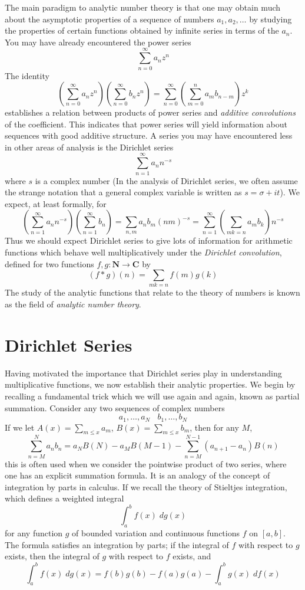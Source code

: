 The main paradigm to analytic number theory is that one may obtain much about the asymptotic properties of a sequence of numbers $a_1, a_2, \dots$ by studying the properties of certain functions obtained by infinite series in terms of the $a_n$. You may have already encountered the power series
%
\[ \sum_{n = 0}^\infty a_n z^n \]
%
The identity
%
\[ \left( \sum_{n = 0}^\infty a_n z^n \right) \left( \sum_{n = 0}^\infty b_n z^n \right) = \sum_{n = 0}^\infty \left( \sum_{m = 0}^n a_m b_{n-m} \right) z^k \]
%
establishes a relation between products of power series and {\it additive convolutions} of the coefficient. This indicates that power series will yield information about sequences with good additive structure. A series you may have encountered less in other areas of analysis is the Dirichlet series
%
\[ \sum_{n = 1}^\infty a_n n^{-s} \]
%
where $s$ is a complex number (In the analysis of Dirichlet series, we often assume the strange notation that a general complex variable is written as $s = \sigma + it$). We expect, at least formally, for
%
\[ \left( \sum_{n = 1}^\infty a_n n^{-s} \right) \left( \sum_{n = 1}^\infty b_n  \right) = \sum_{n,m} a_n b_m (nm)^{-s} = \sum_{n = 1}^\infty \left( \sum_{mk = n} a_m b_k \right) n^{-s} \]
%
Thus we should expect Dirichlet series to give lots of information for arithmetic functions which behave well multiplicatively under the {\it Dirichlet convolution}, defined for two functions $f,g: \mathbf{N} \to \mathbf{C}$ by
%
\[ (f * g)(n) = \sum_{mk = n} f(m) g(k) \]
%
The study of the analytic functions that relate to the theory of numbers is known as the field of {\it analytic number theory}.

\chapter{Dirichlet Series}

Having motivated the importance that Dirichlet series play in understanding multiplicative functions, we now establish their analytic properties. We begin by recalling a fundamental trick which we will use again and again, known as partial summation. Consider any two sequences of complex numbers
%
\[ a_1, \dots, a_N\ \ \ \ b_1, \dots, b_N \]
%
If we let $A(x) = \sum_{m \leq x} a_m$, $B(x) = \sum_{m \leq x} b_m$, then for any $M$,
%
\[ \sum_{n = M}^N a_nb_n = a_N B(N) - a_M B(M-1) - \sum_{n = M}^{N-1} (a_{n+1} - a_n) B(n) \]
%
this is often used when we consider the pointwise product of two series, where one has an explicit summation formula. It is an analogy of the concept of integration by parts in calculus. If we recall the theory of Stieltjes integration, which defines a weighted integral
%
\[ \int_a^b f(x)\; dg(x) \]
%
for any function $g$ of bounded variation and continuous functions $f$ on $[a,b]$. The formula satisfies an integration by parts; if the integral of $f$ with respect to $g$ exists, then the integral of $g$ with respect to $f$ exists, and
%
\[ \int_a^b f(x)\; dg(x) = f(b)g(b) - f(a)g(a) - \int_a^b g(x)\; df(x) \]

